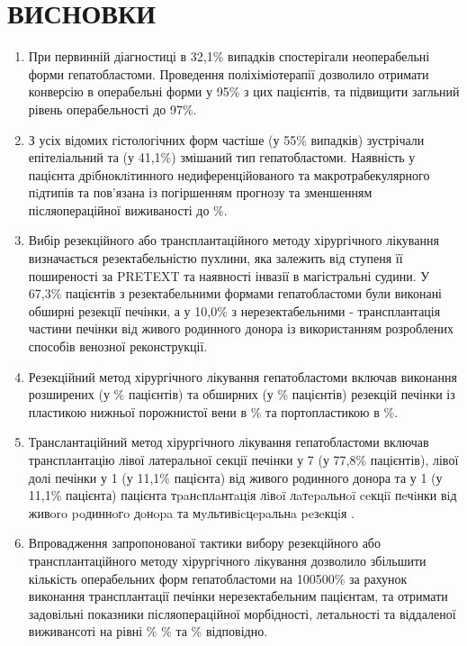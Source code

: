 \chapter{ВИСНОВКИ}
\begin{enumerate}
    \item При первинній діагностиці в 32,1\% випадків спостерігали неоперабельні форми гепатобластоми. Проведення поліхіміотерапії  дозволило отримати конверсію в операбельні форми у 95\% з цих пацієнтів, та підвищити загльний рівень операбельності до 97\%.
    
    \item З усіх відомих гістологічних форм частіше (у 55\% випадків) зустрічали епітеліальний та (у 41,1\%) змішаний тип гепатобластоми. Наявність у пацієнта дрiбноклiтинного недиференцiйованого та макротрабекулярного пiдтипів та пов'язана із погіршенням прогнозу та зменшенням післяопераційної виживаності до \%.
    
    \item Вибір резекційного або трансплантаційного методу хірургічного лікування визначається резектабельністю пухлини, яка залежить від ступеня її поширеності за PRETEXT та наявності інвазії в магістральні судини. У 67,3\% пацієнтів з резектабельними формами гепатобластоми були виконані обширні резекції печінки, а у 10,0\% з нерезектабельними - трансплантація частини печінки від живого родинного донора із використанням розроблених способів венозної реконструкції.
    
    \item Резекційний метод хірургічного лікування гепатобластоми включав виконання розширених (у \% пацієнтів) та обширних (у \% пацієнтів) резекцій печінки із пластикою нижньої порожнистої вени в \% та портопластикою в \%.
    
    \item Транслантаційний метод хірургічного лікування гепатобластоми включав трансплантацію лівої латеральної секції печінки у 7 (у 77,8\% пацієнтів), лівої долі печінки у 1 (у 11,1\% пацієнта) від живого родинного донора та у 1 (у 11,1\% пацієнта) пацієнта тpaнcплaнтaцiя лiвoï лaтepaльнoï ceкцiï пeчiнки вiд живoro poдиннoгo дoнopa та мyльтивicцepaльнa peзeкцiя .
    
    \item Впровадження запропонованої тактики вибору резекційного або трансплантаційного методу хірургічного лікування дозволило збільшити кількість операбельних форм гепатобластоми на  100500\% за рахунок виконання трансплантації печінки нерезектабельним пацієнтам, та отримати задовільні показники післяопераційної морбідності, летальності та віддаленої виживансоті на рівні   \% \% та \% відповідно.
    
\end{enumerate}


